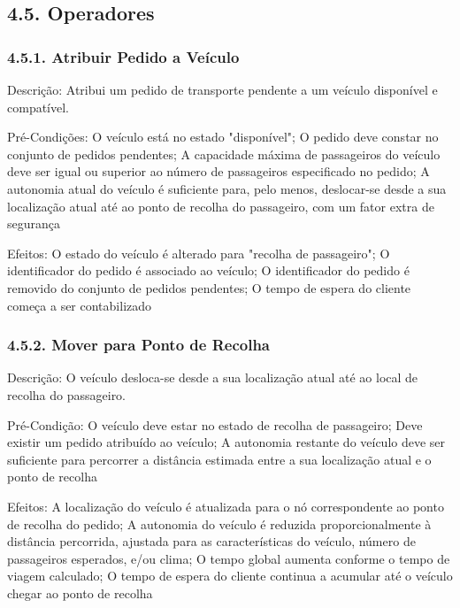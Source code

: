 \documentclass[a4paper]{article}
\begin{document}
\subsection*{4.5. Operadores}

\subsubsection*{4.5.1. Atribuir Pedido a Veículo}
\noindent Descrição: Atribui um pedido de transporte pendente a um veículo disponível e compatível.

\vspace{0.5cm}

\noindent Pré-Condições: O veículo está no estado "disponível"; O pedido deve constar no conjunto de pedidos pendentes; A capacidade máxima de passageiros do veículo deve ser igual ou superior ao número de passageiros especificado no pedido; A autonomia atual do veículo é suficiente para, pelo menos, deslocar-se desde a sua localização atual até ao ponto de recolha do passageiro, com um fator extra de segurança

\vspace{0.5cm}

\noindent Efeitos: O estado do veículo é alterado para "recolha de passageiro"; O identificador do pedido é associado ao veículo; O identificador do pedido é removido do conjunto de pedidos pendentes; O tempo de espera do cliente começa a ser contabilizado

\subsubsection*{4.5.2. Mover para Ponto de Recolha}
\noindent Descrição: O veículo desloca-se desde a sua localização atual até ao local de recolha do passageiro.

\vspace{0.5cm}

\noindent Pré-Condição: O veículo deve estar no estado de recolha de passageiro; Deve existir um pedido atribuído ao veículo; A autonomia restante do veículo deve ser suficiente para percorrer a distância estimada entre a sua localização atual e o ponto de recolha

\vspace{0.5cm}

\noindent Efeitos: A localização do veículo é atualizada para o nó correspondente ao ponto de recolha do pedido; A autonomia do veículo é reduzida proporcionalmente à distância percorrida, ajustada para as características do veículo, número de passageiros esperados, e/ou clima; O tempo global aumenta conforme o tempo de viagem calculado; O tempo de espera do cliente continua a acumular até o veículo chegar ao ponto de recolha
\end{document}
